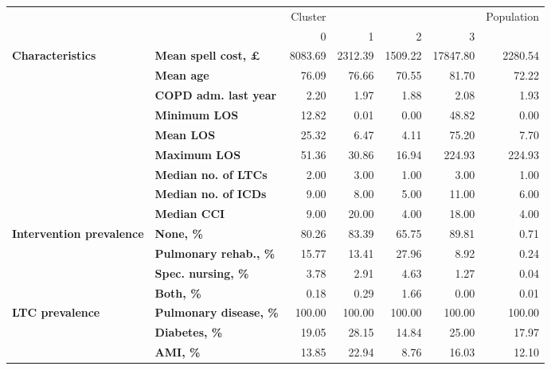 \begin{tabular}{llrrrrr}
\toprule
               &        &  Cluster &          &          &           & Population \\
               &        &        0 &        1 &        2 &         3 &            \\
\midrule
\textbf{Characteristics} & \textbf{Mean spell cost, £} &  8083.69 &  2312.39 &  1509.22 &  17847.80 &    2280.54 \\
               & \textbf{Mean age} &    76.09 &    76.66 &    70.55 &     81.70 &      72.22 \\
               & \textbf{COPD adm. last year} &     2.20 &     1.97 &     1.88 &      2.08 &       1.93 \\
               & \textbf{Minimum LOS} &    12.82 &     0.01 &     0.00 &     48.82 &       0.00 \\
               & \textbf{Mean LOS} &    25.32 &     6.47 &     4.11 &     75.20 &       7.70 \\
               & \textbf{Maximum LOS} &    51.36 &    30.86 &    16.94 &    224.93 &     224.93 \\
               & \textbf{Median no. of LTCs} &     2.00 &     3.00 &     1.00 &      3.00 &       1.00 \\
               & \textbf{Median no. of ICDs} &     9.00 &     8.00 &     5.00 &     11.00 &       6.00 \\
               & \textbf{Median CCI} &     9.00 &    20.00 &     4.00 &     18.00 &       4.00 \\
\textbf{Intervention prevalence} & \textbf{None, \%} &    80.26 &    83.39 &    65.75 &     89.81 &       0.71 \\
               & \textbf{Pulmonary rehab., \%} &    15.77 &    13.41 &    27.96 &      8.92 &       0.24 \\
               & \textbf{Spec. nursing, \%} &     3.78 &     2.91 &     4.63 &      1.27 &       0.04 \\
               & \textbf{Both, \%} &     0.18 &     0.29 &     1.66 &      0.00 &       0.01 \\
\textbf{LTC prevalence} & \textbf{Pulmonary disease, \%} &   100.00 &   100.00 &   100.00 &    100.00 &     100.00 \\
               & \textbf{Diabetes, \%} &    19.05 &    28.15 &    14.84 &     25.00 &      17.97 \\
               & \textbf{AMI, \%} &    13.85 &    22.94 &     8.76 &     16.03 &      12.10 \\

\end{tabular}
